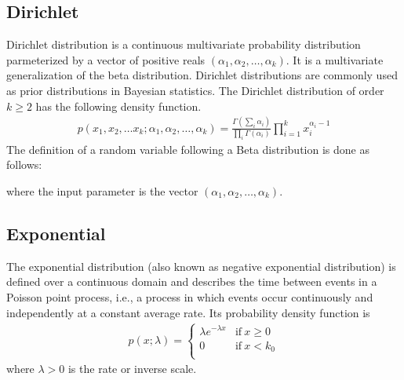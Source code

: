 \documentclass[letterpaper,10pt,english]{sphinxmanual}
\begin{document}
\subsection{Dirichlet}
\label{\detokenize{notes/guidemodels:dirichlet}}
Dirichlet distribution is a continuous multivariate probability distribution parmeterized by a vector of positive reals
\((\alpha_1,\alpha_2,\ldots,\alpha_k)\).
It is a multivariate generalization of the beta distribution. Dirichlet distributions are commonly used as prior
distributions in Bayesian statistics. The Dirichlet distribution of order \(k \geq 2\) has the following density function.
\begin{equation*}
\begin{split}p(x_1,x_2,\ldots x_k; \alpha_1,\alpha_2,\ldots,\alpha_k) = {\frac{\Gamma\left(\sum_i \alpha_i\right)}
{\prod_i \Gamma(\alpha_i)} \prod_{i=1}^k x_i^{\alpha_i-1}}{}\end{split}
\end{equation*}
The definition of a random variable following a Beta distribution is done as follows:

\begin{sphinxVerbatim}[commandchars=\\\{\}]
  \PYG{p}{[}\PYG{p}{]}


  \PYG{p}{[}\PYG{p}{]}
\end{sphinxVerbatim}

where the input parameter  is the vector  \((\alpha_1,\alpha_2,\ldots,\alpha_k)\).


\subsection{Exponential}
\label{\detokenize{notes/guidemodels:exponential}}
The exponential distribution (also known as negative exponential distribution) is defined over a continuous domain and
describes the time between events in a Poisson point process, i.e., a process in which events occur continuously
and independently at a constant average rate. Its probability density function is
\begin{equation*}
\begin{split}p(x;\lambda) =\left\{\begin{array}{cc} \lambda e^{-\lambda x} & \mathrm{if\ } x\geq 0 \\
 0 & \mathrm{if\ } x < k_0 \\ \end{array} \right.\end{split}
\end{equation*}
where \(\lambda>0\) is the rate or inverse scale.
\end{document}
